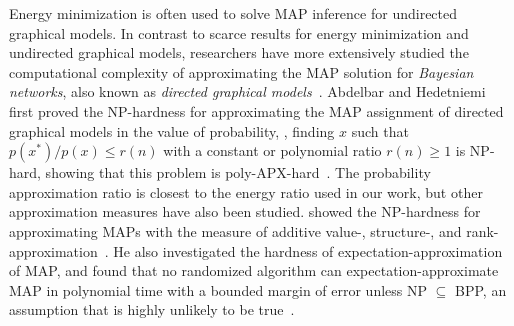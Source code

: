 Energy minimization is often used to solve MAP inference for undirected graphical models. In contrast to scarce results for energy minimization and undirected graphical models, researchers have more extensively studied the computational complexity of approximating the MAP solution for {\em Bayesian networks}, also known as {\em directed graphical models}~\cite{kwisthout2015tree}. Abdelbar and Hedetniemi first proved the NP-hardness for approximating the MAP assignment of directed graphical models in the value of probability, \ie, finding $x$ such that
$p(x^*)/ p(x) \leq r(n)$
with a constant or polynomial ratio $r(n) \geq 1$ is NP-hard, showing that this problem is poly-APX-hard~\cite{Abdelbar-98}. 
The probability approximation ratio is closest to the energy ratio used in our work, but other approximation measures have also been studied.  \citeauthor{Kwisthout-11} showed the NP-hardness for approximating MAPs with the measure of additive value-, structure-, and rank-approximation~\cite{Kwisthout-11,Kwisthout-13,kwisthout2015tree}.
He also investigated the hardness of expectation-approximation of MAP, and found that no randomized algorithm can expectation-approximate MAP in polynomial time with a bounded margin of error unless NP $\subseteq$ BPP, an assumption that is highly unlikely to be true~\cite{kwisthout2015tree}.

